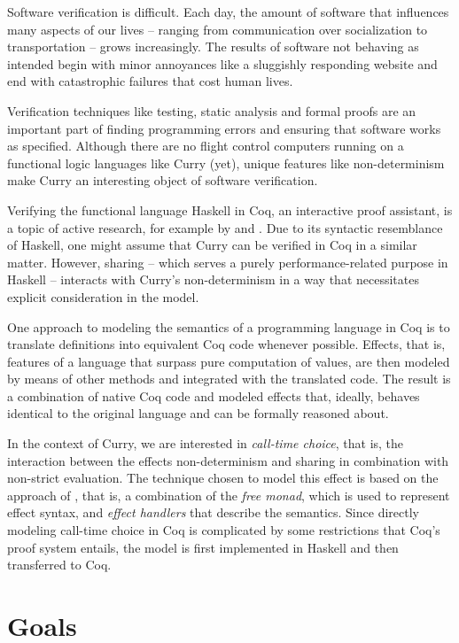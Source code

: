 \documentclass[a4paper, 11pt, fleqn, twoside, abstract=on]{scrreprt}
\begin{document}
Software verification is difficult.
Each day, the amount of software that influences many aspects of our lives -- ranging from communication over socialization to transportation -- grows increasingly.
The results of software not behaving as intended begin with minor annoyances like a sluggishly responding website and end with catastrophic failures that cost human lives.

Verification techniques like testing, static analysis and formal proofs are an important part of finding programming errors and ensuring that software works as specified.
Although there are no flight control computers running on a functional logic languages like Curry (yet), unique features like non-determinism make Curry an interesting object of software verification.

Verifying the functional language Haskell in Coq, an interactive proof assistant, is a topic of active research, for example by \citet{breitner2018ready} and \citet{dylus2019oneMonad}.
Due to its syntactic resemblance of Haskell, one might assume that Curry can be verified in Coq in a similar matter.
However, sharing -- which serves a purely performance-related purpose in Haskell -- interacts with Curry's non-determinism in a way that necessitates explicit consideration in the model.

One approach to modeling the semantics of a programming language in Coq is to translate definitions into equivalent Coq code whenever possible.
Effects, that is, features of a language that surpass pure computation of values, are then modeled by means of other methods and integrated with the translated code.
The result is a combination of native Coq code and modeled effects that, ideally, behaves identical to the original language and can be formally reasoned about.

In the context of Curry, we are interested in \textit{call-time choice}, that is, the interaction between the effects non-determinism and sharing in combination with non-strict evaluation.
The technique chosen to model this effect is based on the approach of \citet{wu2014effect}, that is, a combination of the \textit{free monad}, which is used to represent effect syntax, and \textit{effect handlers} that describe the semantics.
Since directly modeling call-time choice in Coq is complicated by some restrictions that Coq's proof system entails, the model is first implemented in Haskell and then transferred to Coq.

\section{Goals}
\end{document}
